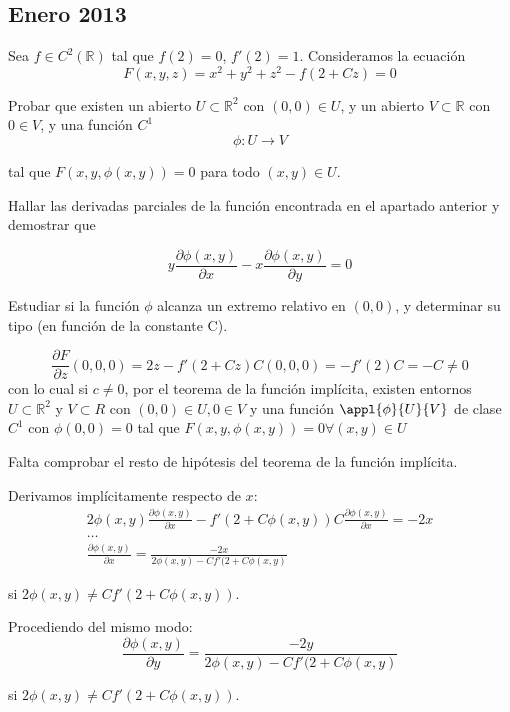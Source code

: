 \subsection{Enero 2013}
\begin{problem}[1]

Sea $f\in C^2(\mathbb{R})$ tal que $f(2) = 0$, $f'(2)=1$. Consideramos la ecuación \\$$F(x,y,z) = x^2+y^2+z^2-f(2+Cz)=0$$

\ppart Probar que existen un abierto $U\subset \mathbb{R}^2$ con $(0,0)\in U$, y un abierto $V\subset \mathbb{R}$ con $0\in V$, y una función $C^1$ \[ \phi: U \rightarrow V \]

tal que $F(x, y, \phi (x, y)) = 0$ para todo $(x,y) \in U$.

\ppart Hallar las derivadas parciales de la función encontrada en el apartado anterior y demostrar que 

\[ y\frac{\partial  \phi (x,y)}{\partial  x} - x\frac{\partial  \phi (x,y)}{\partial  y} = 0 \]

\ppart Estudiar si la función $\phi$ alcanza un extremo relativo en $(0,0)$, y determinar su tipo (en función de la constante C).

\solution

\spart 
\[ \frac{\partial  F}{\partial  z}(0,0,0) = 2z - f'(2+Cz)C (0,0,0) =-f'(2)C = -C \neq 0 \]
con lo cual si $c\neq 0$, por el teorema de la función implícita, existen entornos $U\subset \mathbb{R}^2$ y $V\subset{R}$ con $(0,0)\in U, 0\in V$ y una función $\appl{\phi}{U}{V}$ de clase $C^1$ con $\phi (0,0) = 0$ tal que $F(x,y,\phi (x,y)) = 0 \forall (x,y)\in U$

Falta comprobar el resto de hipótesis del teorema de la función implícita.

\spart 
Derivamos implícitamente respecto de $x$:
\begin{gather*}
2\phi (x,y) \frac{\partial  \phi (x,y)}{\partial  x} - f'(2+C\phi (x,y))C\frac{\partial  \phi (x,y)}{\partial  x}=-2x \\
\hdots \\
\frac{\partial  \phi (x,y)}{\partial  x} = \frac{-2x}{2\phi (x,y) - Cf'(2+C\phi (x,y)}
\end{gather*}

 si $2\phi (x,y) \neq Cf'(2+C\phi (x,y))$.

Procediendo del mismo modo: 
\[ \frac{\partial  \phi (x,y)}{\partial  y} = \frac{-2y}{2\phi (x,y) - Cf'(2+C\phi (x,y)} \] 

si $2\phi (x,y) \neq Cf'(2+C\phi (x,y))$.


\end{problem}
